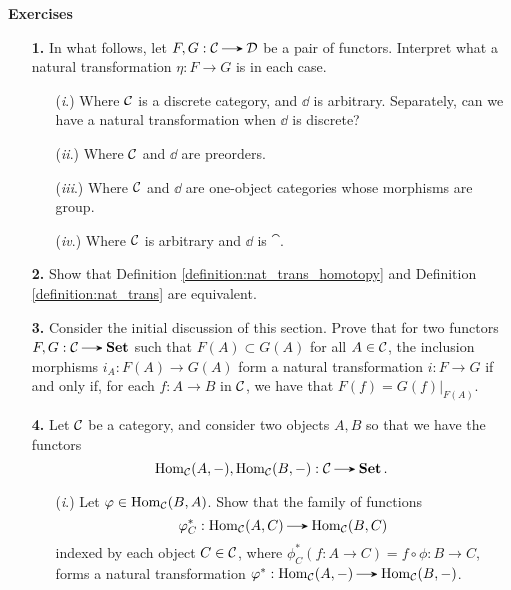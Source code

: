     {\large \textbf{Exercises}
    \vspace{0.5cm}}
    \begin{itemize}
        \item[\textbf{1.}]
        In what follows, let $F,G: \cc \to \dd$ be a pair of functors.
        Interpret what a natural transformation $\eta: F \to G$ is in each case.  
        \begin{itemize}
            \item[(\emph{i}.)]
            Where $\mathcal{C}$ is a discrete category, and $\dd$ is arbitrary. Separately, can we have a natural transformation when $\dd$ is discrete?
            \item[(\emph{ii}.)]
            Where $\mathcal{C}$ and $\dd$ are preorders.

            \item[(\emph{iii}.)] 
            Where $\mathcal{C}$ and $\dd$ are one-object categories whose morphisms are group. 
            \item[(\emph{iv}.)]
            Where $\mathcal{C}$ is arbitrary and $\dd$ is $\cat$.
        \end{itemize}

        \item[\textbf{2.}]
        Show that Definition \ref{definition:nat_trans_homotopy} and Definition \ref{definition:nat_trans}
        are equivalent.

        \item[\textbf{3.}]
        Consider the initial discussion of this section. Prove that for two functors 
        $F, G : \cc \to \Set$ such that $F(A) \subset G(A)$ for all $A \in \mathcal{C}$, 
        the inclusion morphisms $i_A: F(A) \to G(A)$ form a natural transformation 
        $i: F \to G$ if and only if, for each $f: A \to B$ in $\mathcal{C}$, we have that  
        $F(f) = G(f)|_{F(A)}$. 

        \item[\textbf{4.}]
        Let $\mathcal{C}$ be a category, and consider two objects $A,B$ 
        so that we  have the functors 
        \[
            \hom_{\cc}(A, -), \hom_{\cc}(B, -): \cc  \to \Set.
        \] 
        \begin{itemize}
            \item[(\emph{i}.)] Let $\varphi\in \operatorname{\mathrm{Hom}}_{\mathcal{C}}(B,A)$. Show 
            that the family of functions 
            \[
                \phi^*_C: \hom_{\cc}(A,C) \to \hom_{\cc}(B,C)
            \] 
            indexed by each object $C \in \mathcal{C}$,
            where $\phi^*_C(f: A \to  C) = f \circ \phi: B \to C$,
            forms a natural transformation $\phi^*: \hom_{\cc}(A, -) \to \hom_{\cc}(B, -)$.


\end{itemize}
\end{itemize}
